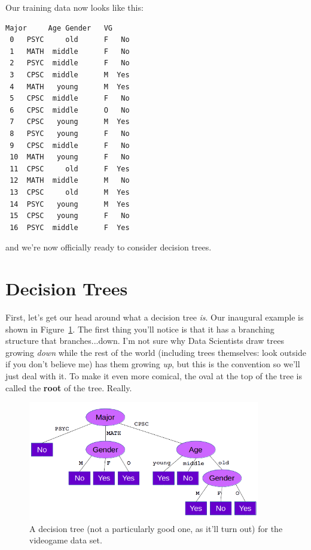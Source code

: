 
\smallskip
Our training data now looks like this:

\begin{Verbatim}[fontsize=\small,samepage=true,frame=single,framesep=3mm,xleftmargin=2.3cm,xrightmargin=2.5cm]
    Major     Age Gender   VG
 0   PSYC     old      F   No
 1   MATH  middle      F   No
 2   PSYC  middle      F   No
 3   CPSC  middle      M  Yes
 4   MATH   young      M  Yes
 5   CPSC  middle      F   No
 6   CPSC  middle      O   No
 7   CPSC   young      M  Yes
 8   PSYC   young      F   No
 9   CPSC  middle      F   No
 10  MATH   young      F   No
 11  CPSC     old      F  Yes
 12  MATH  middle      M   No
 13  CPSC     old      M  Yes
 14  PSYC   young      M  Yes
 15  CPSC   young      F   No
 16  PSYC  middle      F  Yes
\end{Verbatim}
\label{vgDataSet}

and we're now officially ready to consider decision trees.

\section{Decision Trees}


First, let's get our head around what a decision tree \textit{is}. Our
inaugural example is shown in Figure~\ref{fig:decisionTree}. The first thing
you'll notice is that it has a branching structure that branches...down. I'm
not sure why Data Scientists draw trees growing \textit{down} while the rest of
the world (including trees themselves: look outside if you don't believe me)
has them growing \textit{up}, but this is the convention so we'll just deal
with it. To make it even more comical, the oval at the top of the tree is
called the \textbf{root} of the tree. Really.

\begin{figure}[ht]
\centering
\includegraphics[width=0.9\textwidth]{decisionTree.png}
\caption{A decision tree (not a particularly good one, as it'll turn out) for
the videogame data set.}
\label{fig:decisionTree}
\end{figure}

